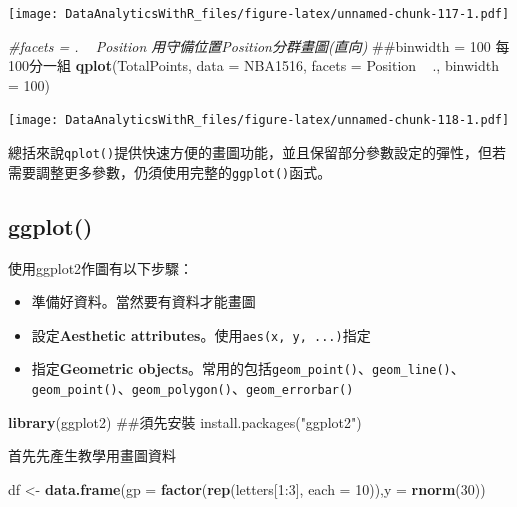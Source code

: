 \documentclass[]{book}
\newenvironment{Shaded}{\begin{snugshade}}{\end{snugshade}}
\newcommand{\KeywordTok}[1]{\textcolor[rgb]{0.13,0.29,0.53}{\textbf{{#1}}}}
\newcommand{\DataTypeTok}[1]{\textcolor[rgb]{0.13,0.29,0.53}{{#1}}}
\newcommand{\DecValTok}[1]{\textcolor[rgb]{0.00,0.00,0.81}{{#1}}}
\newcommand{\StringTok}[1]{\textcolor[rgb]{0.31,0.60,0.02}{{#1}}}
\newcommand{\CommentTok}[1]{\textcolor[rgb]{0.56,0.35,0.01}{\textit{{#1}}}}
\newcommand{\NormalTok}[1]{{#1}}
\providecommand{\tightlist}{%
  \setlength{\itemsep}{0pt}\setlength{\parskip}{0pt}}
\theoremstyle{definition}
\theoremstyle{definition}
\theoremstyle{remark}
\begin{document}
\texttt{[image: DataAnalyticsWithR\_files/figure-latex/unnamed-chunk-117-1.pdf]}

\begin{Shaded}
\begin{Highlighting}[]
\CommentTok{#facets = . ~ Position 用守備位置Position分群畫圖(直向)}
\NormalTok{##binwidth = 100 每100分一組}
\KeywordTok{qplot}\NormalTok{(TotalPoints, }\DataTypeTok{data =} \NormalTok{NBA1516,}
      \DataTypeTok{facets =} \NormalTok{Position ~}\StringTok{ }\NormalTok{., }\DataTypeTok{binwidth =} \DecValTok{100}\NormalTok{)}
\end{Highlighting}
\end{Shaded}

\texttt{[image: DataAnalyticsWithR\_files/figure-latex/unnamed-chunk-118-1.pdf]}

總括來說\texttt{qplot()}提供快速方便的畫圖功能，並且保留部分參數設定的彈性，但若需要調整更多參數，仍須使用完整的\texttt{ggplot()}函式。

\subsection{ggplot()}\label{ggplot}

使用ggplot2作圖有以下步驟：

\begin{itemize}
\tightlist
\item
  準備好資料。當然要有資料才能畫圖
\item
  設定\textbf{Aesthetic attributes}。使用\texttt{aes(x,\ y,\ ...)}指定
\item
  指定\textbf{Geometric
  objects}。常用的包括\texttt{geom\_point()}、\texttt{geom\_line()}、\texttt{geom\_point()}、\texttt{geom\_polygon()}、\texttt{geom\_errorbar()}
\end{itemize}

\begin{Shaded}
\begin{Highlighting}[]
\KeywordTok{library}\NormalTok{(ggplot2) ##須先安裝 install.packages("ggplot2")}
\end{Highlighting}
\end{Shaded}

首先先產生教學用畫圖資料

\begin{Shaded}
\begin{Highlighting}[]
\NormalTok{df <-}\StringTok{ }\KeywordTok{data.frame}\NormalTok{(}\DataTypeTok{gp =} \KeywordTok{factor}\NormalTok{(}\KeywordTok{rep}\NormalTok{(letters[}\DecValTok{1}\NormalTok{:}\DecValTok{3}\NormalTok{], }\DataTypeTok{each =} \DecValTok{10}\NormalTok{)),}\DataTypeTok{y =} \KeywordTok{rnorm}\NormalTok{(}\DecValTok{30}\NormalTok{))}
\end{Highlighting}
\end{Shaded}
\end{document}
